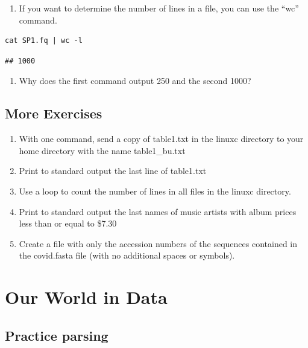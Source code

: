 \documentclass[
]{book}
\providecommand{\tightlist}{%
  \setlength{\itemsep}{0pt}\setlength{\parskip}{0pt}}
\begin{document}
\begin{enumerate}
\def\labelenumi{\arabic{enumi})}
\setcounter{enumi}{6}
\tightlist
\item
  If you want to determine the number of lines in a file, you can use the ``wc'' command.
\end{enumerate}

\begin{verbatim}
cat SP1.fq | wc -l
\end{verbatim}

\begin{verbatim}
## 1000
\end{verbatim}

\begin{enumerate}
\def\labelenumi{\arabic{enumi})}
\setcounter{enumi}{7}
\tightlist
\item
  Why does the first command output 250 and the second 1000?
\end{enumerate}

\hypertarget{more-exercises}{%
\section{More Exercises}\label{more-exercises}}

\begin{enumerate}
\def\labelenumi{\arabic{enumi}.}
\item
  With one command, send a copy of table1.txt in the linuxc directory to your home directory with the name table1\_bu.txt
\item
  Print to standard output the last line of table1.txt
\item
  Use a loop to count the number of lines in all files in the linuxc directory.
\item
  Print to standard output the last names of music artists with album prices less than or equal to \$7.30
\item
  Create a file with only the accession numbers of the sequences contained in the covid.fasta file (with no additional spaces or symbols).
\end{enumerate}

\hypertarget{our-world-in-data}{%
\chapter{Our World in Data}\label{our-world-in-data}}

\hypertarget{practice-parsing}{%
\section{Practice parsing}\label{practice-parsing}}
\end{document}
